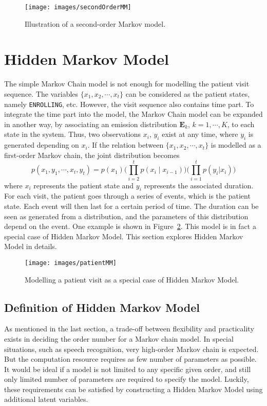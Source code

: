 \begin{figure}[!ht]
	\begin{center}
		\texttt{[image: images/secondOrderMM]}
		\caption{Illustration of a second-order Markov model.}
		\label{fig:secondOrderMM}
	\end{center}
\end{figure}


\section{Hidden Markov Model}
\label{sec:HMM}
The simple Markov Chain model is not enough for modelling the patient visit sequence. The variables \(\{x_1, x_2, \cdots, x_t\}\) can be considered as the patient states, namely \texttt{ENROLLING}, etc. However, the visit sequence also contains time part. To integrate the time part into the model, the Markov Chain model can be expanded in another way, by associating an emission distribution \(\mathbf{E}_k\), \(k = 1, \cdots , K\), to each state in the system. Thus, two observations \(x_i\), \(y_i\) exist at any time, where \(y_i\) is generated depending on \(x_i\). If the relation between \(\{x_1, x_2, \cdots, x_t\}\) is modelled as a first-order Markov chain, the joint distribution becomes
\begin{equation}
	p(x_1, y_1, \cdots, x_t, y_t) = p(x_1)\big(\prod_{i = 2}^{t} p(x_i \mid x_{i-1})\big)\big(\prod_{i=1}^{t}p(y_i|x_i)\big)
\end{equation}
where \(x_i\) represents the patient state and \(y_i\) represents the associated duration. For each visit, the patient goes through a series of events, which is the patient state. Each event will then last for a certain period of time. The duration can be seen as generated from a distribution, and the parameters of this distribution depend on the event. One example is shown in Figure~\ref{fig:patientMM}. This model is in fact a special case of Hidden Markov Model. This section explores Hidden Markov Model in details.

\begin{figure}[!ht]
	\begin{center}
		\texttt{[image: images/patientMM]}
		\caption{Modelling a patient visit as a special case of Hidden Markov Model.}
		\label{fig:patientMM}
	\end{center}
\end{figure}

\subsection{Definition of Hidden Markov Model}
As mentioned in the last section, a trade-off between flexibility and practicality exists in deciding the order number for a Markov chain model. In special situations, such as speech recognition, very high-order Markov chain is expected. But the computation resource requires as few number of parameters as possible. It would be ideal if a model is not limited to any specific given order, and still only limited number of parameters are required to specify the model. Luckily, these requirements can be satisfied by constructing a Hidden Markov Model using additional latent variables. 

